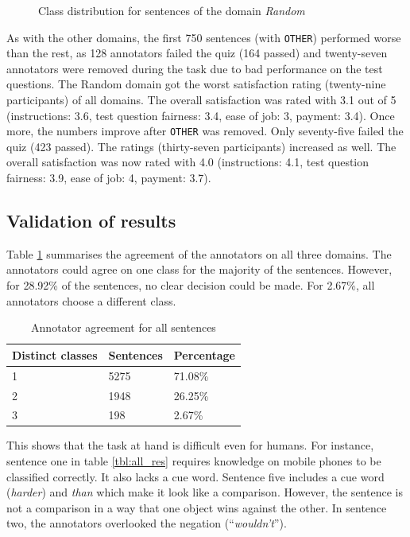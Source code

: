 \begin{figure}[h]
\centering
\caption{Class distribution for sentences of the domain \emph{Random}}
\label{fig:random_fin}
\end{figure}

As with the other domains, the first 750 sentences (with \texttt{OTHER}) performed worse than the rest, as 128 annotators failed the quiz (164 passed) and twenty-seven annotators were removed during the task due to bad performance on the test questions. The Random domain got the worst satisfaction rating (twenty-nine participants) of all domains. The overall satisfaction was rated with 3.1 out of 5 (instructions: 3.6, test question fairness: 3.4, ease of job: 3, payment: 3.4). Once more, the numbers improve after \texttt{OTHER} was removed. Only seventy-five failed the quiz (423 passed). The ratings (thirty-seven participants) increased as well. The overall satisfaction was now rated with 4.0 (instructions: 4.1, test question fairness: 3.9, ease of job: 4, payment: 3.7).


\subsection{Validation of results}

Table \ref{fig:all_agg} summarises the agreement of the annotators on all three domains. The annotators could agree on one class for the majority of the sentences. However, for 28.92\% of the sentences, no clear decision could be made. For 2.67\%, all annotators choose a different class. 

\begin{table}[h]
\caption{Annotator agreement for all sentences}
\label{fig:all_agg}
\begin{tabularx}{\textwidth}{XXX}
\toprule
Distinct classes & Sentences & Percentage \\
\midrule
1 & 5275 & 71.08\%\\
2 & 1948 & 26.25\%\\
3 & 198 & 2.67\%\\
\bottomrule
\end{tabularx}
\end{table}

This shows that the task at hand is difficult even for humans. For instance, sentence one in table \ref{tbl:all_res} requires knowledge on mobile phones to be classified correctly. It also lacks a cue word. Sentence five includes a cue word (\emph{harder}) and \emph{than} which make it look like a comparison. However, the sentence is not a comparison in a way that one object wins against the other. In sentence two, the annotators overlooked the negation (\enquote{\emph{wouldn't}}).

